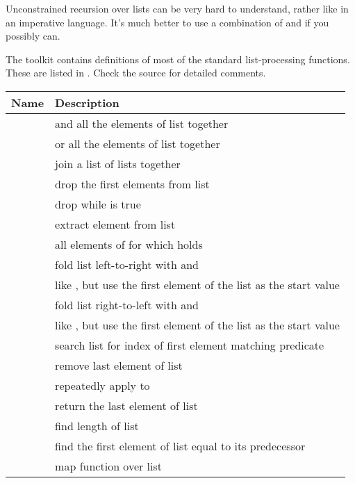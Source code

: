 Unconstrained recursion over lists can be very hard to understand, rather like
 in an imperative language. It's much better to use a combination of
 and  if you possibly can.

The toolkit  contains definitions of most of the standard
list-processing functions. These are listed in . Check the
source for detailed comments.

\begin{tab2}
\begin{center}
\begin{tabular}{||l|l||}
\hline
Name & Description \\
\hline
\ct{all l} 		& and all the elements of list \ct{l} together \\
\ct{any l} 		& or all the elements of list \ct{l} together \\
\ct{concat l} 		& join a list of lists together \\
\ct{drop n l} 		& drop the first \ct{n} elements from list \ct{l} \\
\ct{dropwhile fn l} 	& drop while \ct{fn} is true \\
\ct{extract n l} 	& extract element \ct{n} from list \ct{l} \\
\ct{filter fn l} 	& all elements of \ct{l} for which \ct{fn} holds \\
\ct{foldl fn st l} 	& fold list \ct{l} left-to-right with \ct{fn} 
			  and \ct{st} \\
\ct{foldl1 fn l} 	& like \ct{foldl}, but use the first element of the 
			  list as the start value \\
\ct{foldr fn st l} 	& fold list \ct{l} right-to-left with \ct{fn} 
			  and \ct{st} \\
\ct{foldr1 fn l} 	& like \ct{foldr}, but use the first element of the 
			  list as the start value \\
\ct{index fn l} 	& search list \ct{l} for index of first element 
			  matching predicate \ct{fn} \\
\ct{init l} 		& remove last element of list \ct{l} \\
\ct{iterate f x} 	& repeatedly apply \ct{f} to \ct{x} \\
\ct{last l} 		& return the last element of list \ct{l} \\
\ct{len l} 		& find length of list \ct{l} \\
\ct{limit l}		& find the first element of list \ct{l} equal to
			  its predecessor \\
\ct{map fn l} 		& map function \ct{fn} over list \ct{l} \\

\end{tabular}
\end{center}
\end{tab2}
